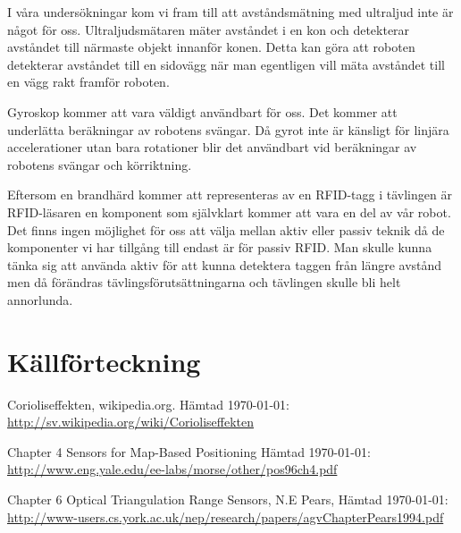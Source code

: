 \documentclass[a4paper,12pt,fleqn]{article}
\begin{document}
I våra undersökningar kom vi fram till att avståndsmätning med ultraljud inte är något för oss. Ultraljudsmätaren mäter avståndet i en kon och detekterar avståndet till närmaste objekt innanför konen. Detta kan göra att roboten detekterar avståndet till en sidovägg när man egentligen vill mäta avståndet till en vägg rakt framför roboten.

Gyroskop kommer att vara väldigt användbart för oss. Det kommer att underlätta beräkningar av robotens svängar. Då gyrot inte är känsligt för linjära accelerationer utan bara rotationer blir det användbart vid beräkningar av robotens svängar och körriktning.

Eftersom en brandhärd kommer att representeras av en RFID-tagg i tävlingen är RFID-läsaren en komponent som självklart kommer att vara en del av vår robot. Det finns ingen möjlighet för oss att välja mellan aktiv eller passiv teknik då de komponenter vi har tillgång till endast är för passiv RFID. Man skulle kunna tänka sig att använda aktiv för att kunna detektera taggen från längre avstånd men då förändras tävlingsförutsättningarna och tävlingen skulle bli helt annorlunda.


\section*{Källförteckning}
\addtocounter{section}{1}

Corioliseffekten, wikipedia.org. Hämtad \today:\newline
\url{http://sv.wikipedia.org/wiki/Corioliseffekten}

Chapter 4 Sensors for Map-Based Positioning Hämtad \today:\newline
\url{http://www.eng.yale.edu/ee-labs/morse/other/pos96ch4.pdf}

Chapter 6 Optical Triangulation Range Sensors, N.E Pears, Hämtad \today:\newline 
\url{http://www-users.cs.york.ac.uk/nep/research/papers/agvChapterPears1994.pdf}
\end{document}
